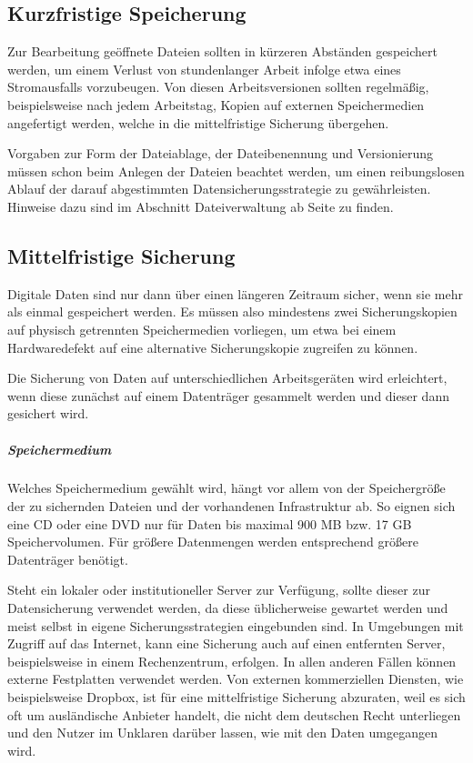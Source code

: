 \subsection{Kurzfristige Speicherung}
Zur Bearbeitung geöffnete Dateien sollten in kürzeren Abständen gespeichert werden, um einem Verlust von stundenlanger Arbeit infolge etwa eines Stromausfalls vorzubeugen. Von diesen Arbeitsversionen sollten regelmäßig, beispielsweise nach jedem Arbeitstag, Kopien auf externen Speichermedien angefertigt werden, welche in die mittelfristige Sicherung übergehen.

Vorgaben zur Form der Dateiablage, der Dateibenennung und Versionierung müssen schon beim Anlegen der Dateien beachtet werden, um einen reibungslosen Ablauf der darauf abgestimmten Datensicherungsstrategie zu gewährleisten. Hinweise dazu sind im Abschnitt Dateiverwaltung ab Seite \pageref{dateiverwaltung} zu finden.

\subsection{Mittelfristige Sicherung}
Digitale Daten sind nur dann über einen längeren Zeitraum sicher, wenn sie mehr als einmal gespeichert werden. Es müssen also mindestens zwei Sicherungskopien auf physisch getrennten Speichermedien vorliegen, um etwa bei einem Hardwaredefekt auf eine alternative Sicherungskopie zugreifen zu können.

Die Sicherung von Daten auf unterschiedlichen Arbeitsgeräten wird erleichtert, wenn diese zunächst auf einem Datenträger gesammelt werden und dieser dann gesichert wird.

\subparagraph{Speichermedium} Welches Speichermedium gewählt wird, hängt vor allem von der Speichergröße der zu sichernden Dateien und der vorhandenen Infrastruktur ab. So eignen sich eine CD oder eine DVD nur für Daten bis maximal 900 MB bzw. 17 GB Speichervolumen. Für größere Datenmengen werden entsprechend größere Datenträger benötigt. 

Steht ein lokaler oder institutioneller Server zur Verfügung, sollte dieser zur Datensicherung verwendet werden, da diese üblicherweise gewartet werden und meist selbst in eigene Sicherungsstrategien eingebunden sind. In Umgebungen mit Zugriff auf das Internet, kann eine Sicherung auch auf einen entfernten Server, beispielsweise in einem Rechenzentrum, erfolgen. In allen anderen Fällen können externe Festplatten verwendet werden. Von externen kommerziellen Diensten, wie beispielsweise Dropbox, ist für eine mittelfristige Sicherung abzuraten, weil es sich oft um ausländische Anbieter handelt, die nicht dem deutschen Recht unterliegen und den Nutzer im Unklaren darüber lassen, wie mit den Daten umgegangen wird.

